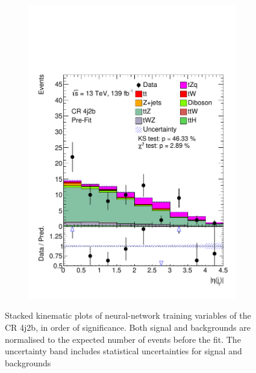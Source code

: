 \begin{figure}[!h]
\begin{subfigure}[b]{0.33\linewidth}
    \includegraphics[width=\linewidth]{ubonn-thesis/Chapters/Chapters_06/Figure/Input_distribution/CR_4j2b_forwardjet_eta.pdf} 
  \end{subfigure} 
   \caption{Stacked kinematic plots of neural-network training variables of the CR 4j2b, in order of significance. Both signal and backgrounds are normalised to the expected number of events before the fit. The uncertainty band includes statistical uncertainties for signal and backgrounds}
  \label{fig_control4} 
\end{figure}


